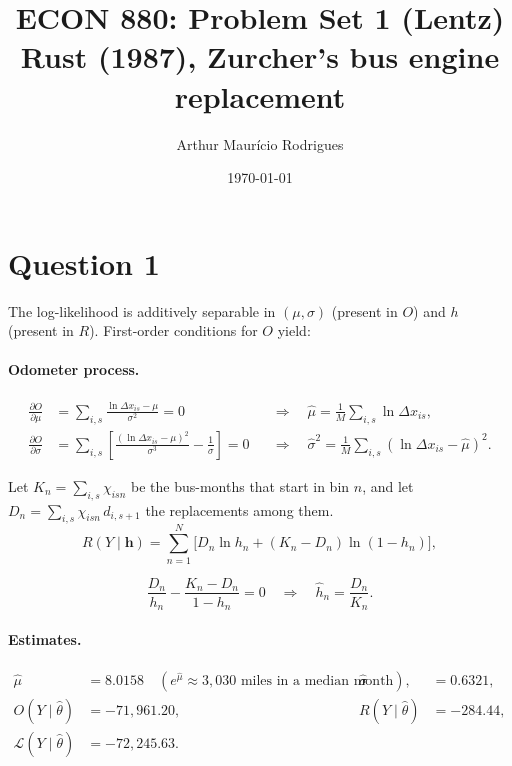 \documentclass[11pt]{article}
\title{ECON 880: Problem Set 1 (Lentz)\\[2pt] \large Rust (1987), Zurcher's bus engine replacement}
\author{Arthur Maur\'icio Rodrigues}
\date{\today}
\begin{document}
\maketitle

\section*{Question 1}

The log-likelihood is additively separable in $(\mu,\sigma)$ (present in $O$) and $h$ (present in $R$). First-order conditions for $O$ yield:

\paragraph{Odometer process.}
\begin{align*}
  \frac{\partial O}{\partial \mu} &= \sum_{i,s} \frac{\ln\Delta x_{is} - \mu}{\sigma^2} = 0
    &&\Longrightarrow\quad \hat\mu = \frac{1}{M}\sum_{i,s}\ln\Delta x_{is},\\
  \frac{\partial O}{\partial \sigma} &= \sum_{i,s}\left[\frac{(\ln\Delta x_{is} - \mu)^2}{\sigma^3} - \frac{1}{\sigma}\right] = 0
    &&\Longrightarrow\quad \hat\sigma^2 = \frac{1}{M}\sum_{i,s}\left(\ln\Delta x_{is} - \hat\mu\right)^2.
\end{align*}


Let $K_n = \sum_{i,s}\chi_{isn}$ be the bus-months that start in bin $n$, and let $D_n = \sum_{i,s}\chi_{isn}\,d_{i,s+1}$ the replacements among them.
\[
  R(Y\mid\bm h) = \sum_{n=1}^{N}\Big[D_n\ln h_n + (K_n - D_n)\ln(1-h_n)\Big],
\]

\[
  \frac{D_n}{h_n} - \frac{K_n - D_n}{1-h_n} = 0
  \quad\Longrightarrow\quad
  \hat h_n = \frac{D_n}{K_n}.
\]

\paragraph{Estimates.}
\begin{align*}
  \hat\mu &= 8.0158 \quad (e^{\hat\mu} \approx 3{,}030 \text{ miles in a median month}), &
  \hat\sigma &= 0.6321,\\
  O(Y\mid\hat\theta) &= -71{,}961.20, &
  R(Y\mid\hat\theta) &= -284.44,\\
  \mathcal{L}(Y\mid\hat\theta) &= -72{,}245.63. &&
\end{align*}
\end{document}
